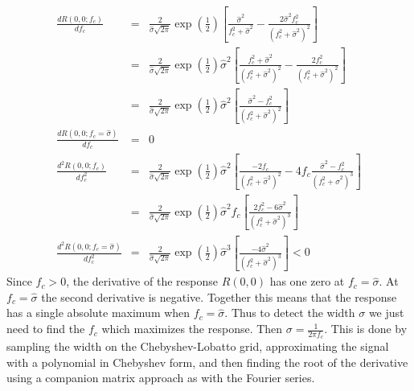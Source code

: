 \documentclass{article}
\begin{document}
\begin{eqnarray}
    \frac{dR(0,0 ; f_c)}{df_c} & = & \frac{2}{\hat{\sigma}\sqrt{2\pi}} \exp(\frac{1}{2}) \left[ \frac{\hat{\sigma}^2}{f_c^2+\hat{\sigma}^2} - \frac{2\hat{\sigma}^2f_c^2}{(f_c^2+\hat{\sigma}^2)^2}\right] \\
    & = & \frac{2}{\hat{\sigma}\sqrt{2\pi}} \exp(\frac{1}{2}) \hat{\sigma}^2 \left[ \frac{ f_c^2+\hat{\sigma}^2  }{(f_c^2+\hat{\sigma}^2)^2} - \frac{2f_c^2}{(f_c^2+\hat{\sigma}^2)^2}\right] \\
    & = & \frac{2}{\hat{\sigma}\sqrt{2\pi}} \exp(\frac{1}{2}) \hat{\sigma}^2 \left[ \frac{ \hat{\sigma}^2 - f_c^2  }{(f_c^2 + \hat{\sigma}^2)^2} \right] \\
    \frac{dR(0,0 ; f_c = \hat{\sigma})}{df_c} & = &  0 \\
    \frac{d^2R(0,0 ; f_c)}{df_c^2} & = & \frac{2}{\hat{\sigma}\sqrt{2\pi}} \exp(\frac{1}{2}) \hat{\sigma}^2 \left[ \frac{ -2 f_c  }{ (f_c^2+\hat{\sigma}^2)^2 } 
	    -4 f_c \frac{ \hat{\sigma}^2 - f_c^2  }{ (f_c^2+\hat{\sigma}^2)^3 } \right]  \\
	    & = & \frac{2}{\hat{\sigma}\sqrt{2\pi}} \exp(\frac{1}{2}) \hat{\sigma}^2  f_c \left[ \frac{ 2 f_c^2 -6 \hat{\sigma}^2  }{ (f_c^2+\hat{\sigma}^2)^3 } \right] \\
	    \frac{d^2R(0,0 ; f_c = \hat{\sigma} )}{df_c^2} & = & \frac{2}{\hat{\sigma}\sqrt{2\pi}} \exp(\frac{1}{2}) \hat{\sigma}^3   \left[ \frac{ -4 \hat{\sigma}^2  }{ (f_c^2+\hat{\sigma}^2)^3 } \right] < 0
\end{eqnarray}
Since $ f_c > 0 $, the derivative of the response $ R(0,0) $ has one zero at $ f_c = \hat{\sigma} $. At $ f_c = \hat{\sigma} $ the second derivative is negative. Together this means that the response has a single absolute maximum when $ f_c = \hat{\sigma} $. Thus to detect the width $ \sigma $ we just need to find the $ f_c $ which maximizes the response. Then $ \sigma = \frac{1}{2\pi f_c} $. This is done by sampling the width on the Chebyshev-Lobatto grid, approximating the signal with a polynomial in Chebyshev form, and then finding the root of the derivative using a companion matrix approach as with the Fourier series.
\end{document}
